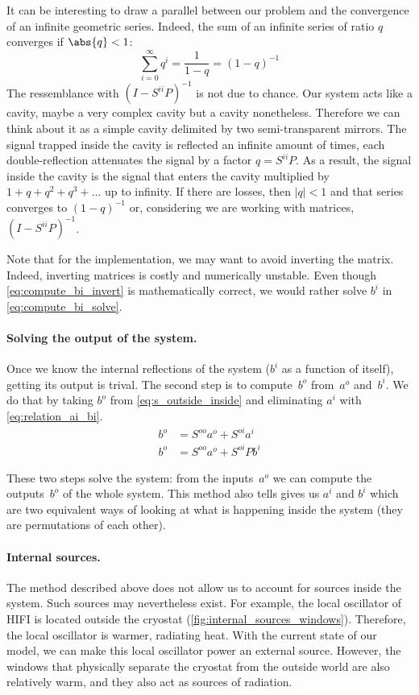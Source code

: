 It can be interesting to draw a parallel between our problem and the convergence of an infinite geometric series.
Indeed, the sum of an infinite series of ratio $q$ converges if $\abs{q} < 1$:
\begin{equation}
    \sum_{i=0}^\infty q^i = \frac{1}{1-q} = (1-q)^{-1}
\end{equation}
The ressemblance with $(I - S^{ii}P)^{-1}$ is not due to chance.
Our system acts like a cavity, maybe a very complex cavity but a cavity nonetheless.
Therefore we can think about it as a simple cavity delimited by two semi-transparent mirrors.
The signal trapped inside the cavity is reflected an infinite amount of times, each double-reflection attenuates the signal by a factor $q=S^{ii}P$.
As a result, the signal inside the cavity is the signal that enters the cavity multiplied by $1+q+q^2+q^3+\dots$ up to infinity.
If there are losses, then $|q|<1$ and that series converges to $(1-q)^{-1}$ or, considering we are working with matrices, $(I - S^{ii}P)^{-1}$.

Note that for the implementation, we may want to avoid inverting the matrix.
Indeed, inverting matrices is costly and numerically unstable.
Even though \cref{eq:compute_bi_invert} is mathematically correct, we would rather solve $b^i$ in \cref{eq:compute_bi_solve}.

\paragraph{Solving the output of the system.}
Once we know the internal reflections of the system ($b^i$ as a function of itself), getting its output is trival.
The second step is to compute~$b^o$ from~$a^o$ and~$b^i$.
We do that by taking $b^o$ from \cref{eq:s_outside_inside} and eliminating $a^i$ with \cref{eq:relation_ai_bi}.
\begin{align}
    b^o &= S^{oo}a^o + S^{oi}a^i \\
    b^o &= S^{oo}a^o + S^{oi}Pb^i \label{eq:compute_bo}
\end{align}

These two steps solve the system: from the inputs~$a^o$ we can compute the outputs~$b^o$ of the whole system.
This method also tells gives us $a^i$ and $b^i$ which are two equivalent ways of looking at what is happening inside the system (they are permutations of each other).



\paragraph{Internal sources.}
The method described above does not allow us to account for sources inside the system.
Such sources may nevertheless exist.
For example, the local oscillator of HIFI is located outside the cryostat (\cref{fig:internal_sources_windows}).
Therefore, the local oscillator is warmer, radiating heat.
With the current state of our model, we can make this local oscillator power an external source.
However, the windows that physically separate the cryostat from the outside world are also relatively warm, and they also act as sources of radiation.

